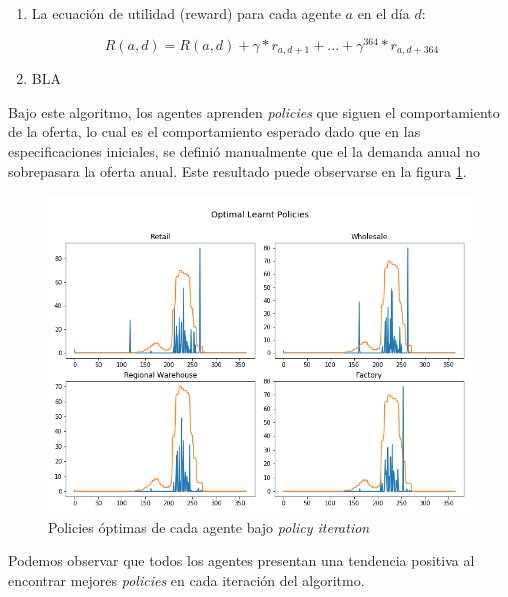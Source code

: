 \begin{enumerate}
    \item La ecuaci\'on de utilidad (reward) para cada agente $a$ en el d\'ia $d$:

$$
R(a, d) = R(a,d) + \gamma*r_{a, d+1} + ... + \gamma^{364}*r_{a,d+364}
$$

    \item BLA
\end{enumerate}




Bajo este algoritmo, los agentes aprenden \textit{policies} que siguen el comportamiento de la oferta, lo cual es el comportamiento esperado dado que en las especificaciones iniciales, se defini\'o manualmente que el la demanda anual no sobrepasara la oferta anual. Este resultado puede observarse en la figura \ref{politer_policies}. \\

\begin{figure}[ht]
\caption{Policies \'optimas de cada agente bajo \textit{policy iteration}}
\label{politer_policies}
\includegraphics[width=15cm]{tesis_tex/figs/policyiteration_policies.png}
\centering
\end{figure}

Podemos observar que todos los agentes presentan una tendencia positiva al encontrar mejores \textit{policies} en cada iteraci\'on del algoritmo.

